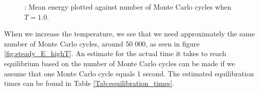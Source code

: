 \documentclass{article}
\begin{document}
{		\begin{figure}[H]
		\caption{: Mean energy plotted against number of Monte Carlo cycles when $T = 1.0$.}
		\label{fig:steady_E}
		\end{figure}

		When we increase the temperature, we see that we need approximately the same number of Monte Carlo cycles, around 50 000, as seen in figure \ref{fig:steady_E_highT}. An estimate for the actual time it takes to reach equilibrium based on the number of Monte Carlo cycles can be made if we assume that one Monte Carlo cycle equals 1 second. The estimated equilibration times can be found in Table \ref{Tab:equilibration_times}.

}
\end{document}
